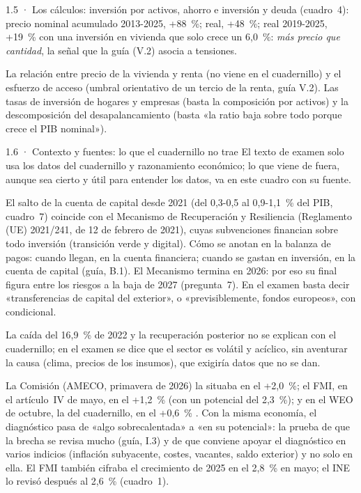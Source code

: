 \begin{complemento}{1.5 · Los cálculos: inversión por activos, ahorro e inversión y deuda}
 (cuadro~4): precio nominal acumulado 2013-2025, +88~\%; real, +48~\%; real 2019-2025, +19~\% con una inversión en vivienda que solo crece un 6,0~\%: \emph{más precio que cantidad}, la señal que la guía (V.2) asocia a tensiones.

 La relación entre precio de la vivienda y renta (no viene en el cuadernillo) y el esfuerzo de acceso (umbral orientativo de un tercio de la renta, guía V.2).  Las tasas de inversión de hogares y empresas (basta la composición por activos) y la descomposición del desapalancamiento (basta «la ratio baja sobre todo porque crece el PIB nominal»).
\end{complemento}

\begin{complemento}{1.6 · Contexto y fuentes: lo que el cuadernillo no trae}
 El texto de examen solo usa los datos del cuadernillo y razonamiento económico; lo que viene de fuera, aunque sea cierto y útil para entender los datos, va en este cuadro con su fuente.

 El salto de la cuenta de capital desde 2021 (del 0,3-0,5 al 0,9-1,1~\% del PIB, cuadro~7) coincide con el Mecanismo de Recuperación y Resiliencia (Reglamento (UE) 2021/241, de 12 de febrero de 2021), cuyas subvenciones financian sobre todo inversión (transición verde y digital). Cómo se anotan en la balanza de pagos: cuando llegan, en la cuenta financiera; cuando se gastan en inversión, en la cuenta de capital \parencite{BdE2021NGEU} (guía, B.1). El Mecanismo termina en 2026: por eso su final figura entre los riesgos a la baja de 2027 (pregunta~7). En el examen basta decir «transferencias de capital del exterior», o «previsiblemente, fondos europeos», con condicional.

 La caída del 16,9~\% de 2022 y la recuperación posterior no se explican con el cuadernillo; en el examen se dice que el sector es volátil y acíclico, sin aventurar la causa (clima, precios de los insumos), que exigiría datos que no se dan.

 La Comisión (AMECO, primavera de 2026) la situaba en el +2,0~\%; el FMI, en el artículo~IV de mayo, en el +1,2~\% (con un potencial del 2,3~\%); y en el WEO de octubre, la del cuadernillo, en el +0,6~\% . Con la misma economía, el diagnóstico pasa de «algo sobrecalentada» a «en su potencial»: la prueba de que la brecha se revisa mucho (guía, I.3) y de que conviene apoyar el diagnóstico en varios indicios (inflación subyacente, costes, vacantes, saldo exterior) y no solo en ella. El FMI también cifraba el crecimiento de 2025 en el 2,8~\% en mayo; el INE lo revisó después al 2,6~\% (cuadro~1).


\end{complemento}
